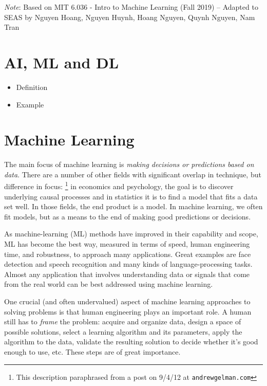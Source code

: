 \documentclass[11pt]{article}
\newcommand{\note}[1]{\todo[color=blue!10,
  linecolor=blue!90,size=\small]{\linespread{0.9}\selectfont{#1}\par}}
\renewcommand{\note}[1]{\footnote{#1}}
\begin{document}



\emph{Note}: Based on MIT 6.036 - Intro to Machine Learning (Fall 2019) -- Adapted to SEAS by Nguyen Hoang, Nguyen Huynh, Hoang Nguyen, Quynh Nguyen, Nam Tran

\section{AI, ML and DL}
\begin{itemize}
    \item Definition
    \item Example
\end{itemize}
\section{Machine Learning}
The main focus of machine learning is {\em making decisions or
  predictions based on data}.  There are a number of other fields with
significant overlap in technique, but difference in focus: \note{This
  description paraphrased from a post on 9/4/12 at {\tt andrewgelman.com}}
in economics and psychology, the goal is to discover underlying causal
processes and in statistics it is to find a model that fits a data set
well.  In those fields, the end product is a model.  In machine
learning, we often fit models, but as a means to the end of making
good predictions or decisions.

As machine-learning (ML) methods have improved in their capability and
scope, ML has become the best way, measured in terms of speed, human
engineering time, and robustness, to approach many applications.  Great
examples are face detection and speech recognition and many kinds of
language-processing tasks.   Almost any application that involves
understanding data or signals that come from the real world can be
best addressed using machine learning.

One crucial (and often undervalued) aspect of machine
learning approaches to solving problems is that human engineering
plays an important role.  A human still has to {\em frame} the
problem:  acquire and organize data, design a space of possible
solutions, select a learning algorithm and its parameters, apply the
algorithm to the data, validate the resulting solution to decide
whether it's good enough to use, etc.   These steps are of great
importance.  
\end{document}
